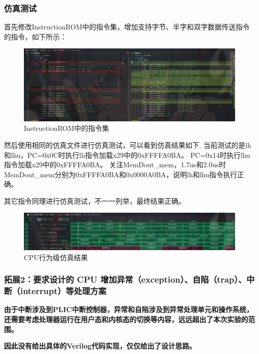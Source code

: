 \documentclass[12pt,hyperref,a4paper,UTF8]{ctexart}
\begin{document}
\subsubsection*{\Large 仿真测试}
\normalsize

首先修改InstructionROM中的指令集，增加支持字节、半字和双字数据传送指令的指令，如下所示：

    \begin{figure}[H]
        \centering
        \includegraphics[width=1\textwidth]{figures/fig/image21.png}
        \caption{InstructionROM中的指令集}
    \end{figure}

然后使用相同的仿真文件进行仿真测试，可以看到仿真结果如下.
当前测试的是lh和lhu，PC=0x0C时执行lh指令加载x29中的0xFFFFA0BA。
PC=0x14时执行lhu指令加载x29中的0xFFFFA0BA。
关注MemDout\_mem，1.7us和2.0us时MemDout\_mem分别为0xFFFFA0BA和0x0000A0BA，说明lh和lhu指令执行正确。

其它指令同理进行仿真测试，不一一列举，最终结果正确。
    \begin{figure}[H]
        \centering
        \includegraphics[width=1\textwidth]{figures/fig/sim10.png}
        \caption{CPU行为级仿真结果}
    \end{figure}

\subsubsection*{\Large 拓展2：要求设计的 CPU 增加异常（exception）、自陷（trap）、中断（interrupt）等处理方案}
\normalsize
\textbf{由于中断涉及到PLIC中断控制器，异常和自陷涉及到异常处理单元和操作系统，还需要考虑处理器运行在用户态和内核态的切换等内容，远远超出了本次实验的范围。}

\textbf{因此没有给出具体的Verilog代码实现，仅仅给出了设计思路。}
\end{document}

